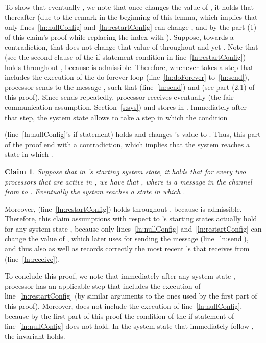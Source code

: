 \documentclass[11pt]{article}
\newtheorem{claim}[theorem]{Claim}
\newenvironment{proof}{\noindent{\bf Proof.}}{\hfill}
\begin{document}
\begin{proof}
\begin{proof}
To show that eventually , we note that once  changes the value of , it holds that   thereafter (due to the remark in the beginning of this lemma, which implies that only lines~\ref{ln:nullConfig} and~\ref{ln:restartConfig} can change , and by the part (1) of this claim's proof while replacing the index  with ). Suppose, towards a contradiction, that  does not change that value of  throughout  and yet . 
Note that  (see the second clause of the if-statement condition in line~\ref{ln:restartConfig}) holds throughout , because  is admissible. Therefore, whenever  takes a step that includes the execution of the do forever loop (line~\ref{ln:doForever} to~\ref{ln:send}), processor  sends to  the message , such that  (line~\ref{ln:send}) and  (see part (2.1) of this proof). Since  sends  repeatedly, processor  receives eventually  (the fair communication assumption, Section~\ref{s:sys}) and stores in . Immediately after that step, the system state allows  to take a step in which the condition 

(line~\ref{ln:nullConfig}'s if-statement) holds and  changes 's value to . Thus, this part of the proof end with a contradiction, which implies that the system reaches a state in which .
\end{proof}


\begin{claim}
\label{thm:2Config}
Suppose that in 's starting system state, it holds that for every two  processors  that are active in , we have that , where  is a message in the channel from  to . Eventually the system reaches a state in which .  
\end{claim} 

\begin{proof}
 Moreover,  (line~\ref{ln:restartConfig}) holds throughout , because  is admissible. Therefore, this claim assumptions with respect to 's starting states actually hold for any system state , because only lines~\ref{ln:nullConfig} and~\ref{ln:restartConfig} can change the value of , which later  uses for sending the message  (line~\ref{ln:send}), and thus also  as well as  records correctly the most recent 's that  receives from  (line~\ref{ln:receive}).    

To conclude this proof, we note that immediately after any system state , processor  has an applicable step  that includes the execution of line~\ref{ln:restartConfig} (by similar arguments to the ones used by the first part of this proof). Moreover,  does not include the execution of line~\ref{ln:nullConfig}, because by the first part of this proof the condition of the if-statement of line~\ref{ln:nullConfig} does not hold. In the system state that immediately follow , the invariant  holds. 
\end{proof}




\end{proof}
\end{document}
